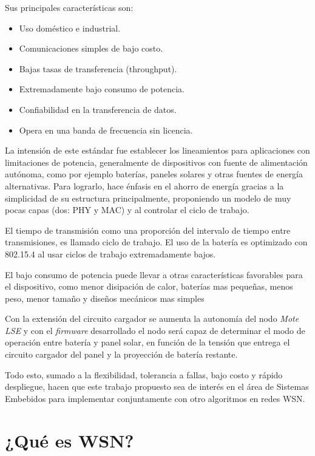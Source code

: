 \noindent Sus principales características son:
		\begin{itemize}
			\item Uso doméstico e industrial.
			\item Comunicaciones simples de bajo costo. 
			\item Bajas tasas de transferencia (throughput).
			\item Extremadamente bajo consumo de potencia.
			\item Confiabilidad en la transferencia de datos.
			\item Opera en una banda de frecuencia sin licencia.
		\end{itemize}

La intensión de este estándar fue establecer los lineamientos para aplicaciones con limitaciones de potencia, generalmente de dispositivos con fuente de alimentación autónoma, como por ejemplo baterías, paneles solares y otras fuentes de energía alternativas. Para lograrlo, hace énfasis en el ahorro de energía gracias a la simplicidad de su estructura principalmente, proponiendo un modelo de muy pocas capas (dos: PHY y MAC) y al controlar el ciclo de trabajo.

El tiempo de transmisión como una proporción del intervalo de tiempo entre transmisiones, es llamado ciclo de trabajo. El uso de la batería es optimizado con 802.15.4 al usar ciclos de trabajo extremadamente bajos. 

El bajo consumo de potencia puede llevar a otras características favorables para el dispositivo, como menor disipación de calor, baterías mas pequeñas, menos peso, menor tamaño y diseños mecánicos mas simples
		
Con la extensión del circuito cargador se aumenta la autonomía del nodo \textit{Mote LSE} y con el \textit{firmware} desarrollado el nodo será capaz de determinar el modo de operación entre batería y panel solar, en función de la tensión que entrega el circuito cargador del panel y la proyección de batería restante.

Todo esto, sumado a la flexibilidad, tolerancia a fallas, bajo costo y rápido despliegue, hacen que este trabajo propuesto sea de interés en el área de Sistemas Embebidos para implementar conjuntamente con otro algoritmos en redes WSN.

\section{¿Qué es WSN?}
\label{sec:wsn}

